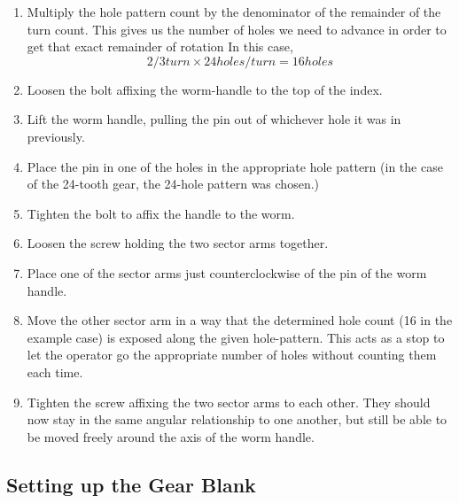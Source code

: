 \documentclass[12pt,twoside,letterpaper]{article}
\begin{document}
\begin{enumerate}
	\item Multiply the hole pattern count by the denominator of the remainder of the turn count. This gives us the number of holes we need to advance in order to get that exact remainder of rotation In this case,
		\[ 2/3 turn \times 24 holes/turn = 16 holes \]
	\item Loosen the bolt affixing the worm-handle to the top of the index.
	\item Lift the worm handle, pulling the pin out of whichever hole it was in previously.
	\item Place the pin in one of the holes in the appropriate hole pattern (in the case of the 24-tooth gear, the 24-hole pattern was chosen.)
	\item Tighten the bolt to affix the handle to the worm.
	\item Loosen the screw holding the two sector arms together.
	\item Place one of the sector arms just counterclockwise of the pin of the worm handle.
	\item Move the other sector arm in a way that the determined hole count (16 in the example case) is exposed along the given hole-pattern. This acts as a stop to let the operator go the appropriate number of holes without counting them each time.
	\item Tighten the screw affixing the two sector arms to each other. They should now stay in the same angular relationship to one another, but still be able to be moved freely around the axis of the worm handle.
\end{enumerate}



\subsection{Setting up the Gear Blank}
\end{document}
